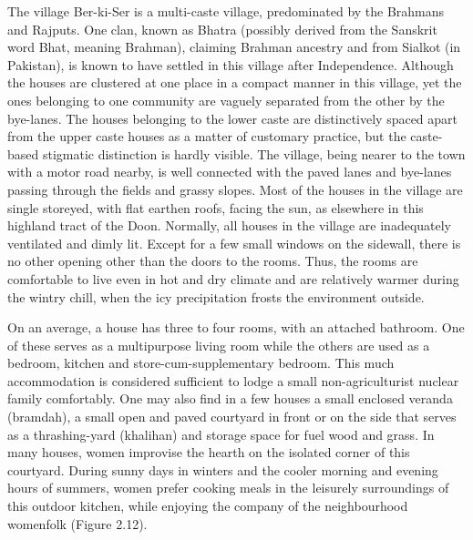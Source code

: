 The village Ber-ki-Ser is a multi-caste village, predominated by the Brahmans and Rajputs. One clan, known as Bhatra (possibly derived from the Sanskrit word Bhat, meaning Brahman), claiming Brahman ancestry and from Sialkot (in Pakistan), is known to have settled in this village after Independence. Although the houses are clustered at one place in a compact manner in this village, yet the ones belonging to one community are vaguely separated from the other by the bye-lanes. The houses belonging to the lower caste are distinctively spaced apart from the upper caste houses as a matter of customary practice, but the caste-based stigmatic distinction is hardly visible. The village, being nearer to the town with a motor road nearby, is well connected with the paved lanes and bye-lanes passing through the fields and grassy slopes. Most of the houses in the village are single storeyed, with flat earthen roofs, facing the sun, as elsewhere in this highland tract of the Doon. Normally, all houses in the village are inadequately ventilated and dimly lit. Except for a few small windows on the sidewall, there is no other opening other than the doors to the rooms. Thus, the rooms are comfortable to live even in hot and dry climate and are relatively warmer during the wintry chill, when the icy precipitation frosts the environment outside.

On an average, a house has three to four rooms, with an attached bathroom. One of these serves as a multipurpose living room while the others are used as a bedroom, kitchen and store-cum-supplementary bedroom. This much accommodation is considered sufficient to lodge a small non-agriculturist nuclear family comfortably. One may also find in a few houses a small enclosed veranda (bramdah), a small open and paved courtyard in front or on the side that serves as a thrashing-yard (khalihan) and storage space for fuel wood and grass. In many houses, women improvise the hearth on the isolated corner of this courtyard. During sunny days in winters and the cooler morning and evening hours of summers, women prefer cooking meals in the leisurely surroundings of this outdoor kitchen, while enjoying the company of the neighbourhood womenfolk (Figure 2.12).

